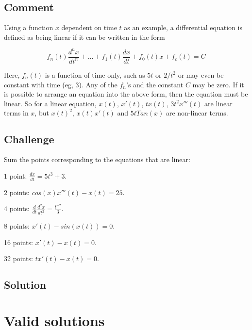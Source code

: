 \subsection*{Comment}
Using a function $x$ dependent on time $t$ as an example, a differential equation is defined as being linear if it can be written in the form

\begin{equation}
    f_n(t) \frac{d^nx}{d t^n} + \dots + f_1(t) \frac{dx}{dt} + f_0(t) x + f_c(t) = C
\end{equation}

Here, $f_n(t)$ is a function of time only, such as $5t$ or $2/t^2$ or may even be constant with time (eg, $3$).
Any of the $f_n$'s and the constant $C$ may be zero.
If it is possible to arrange an equation into the above form, then the equation must be linear.
So for a linear equation, $x(t)$, $x'(t)$, $t x(t)$, $3t^2 x'''(t)$ are linear terms in $x$, but $x(t)^2$, $x(t) x'(t)$ and $5 t Tan(x)$ are non-linear terms.

\subsection*{Challenge}
Sum the points corresponding to the equations that are linear:

1 point: $\displaystyle \frac{dx}{dt} = 5t^3 + 3$.

2 points: $\displaystyle cos(x) x'''(t) - x(t) = 25$.

4 points: $\displaystyle \frac{d}{dt} \frac{d^2 x}{dt^2} = \frac{t^{-2}}{3}$.

8 points: $\displaystyle x'(t) - sin(x(t)) = 0$.

16 points: $\displaystyle x'(t) - x(t) = 0$.

32 points: $\displaystyle t x'(t) - x(t) = 0$.

\subsection*{Solution}
\six{}


\timebox


\newpage

\section{Valid solutions}

